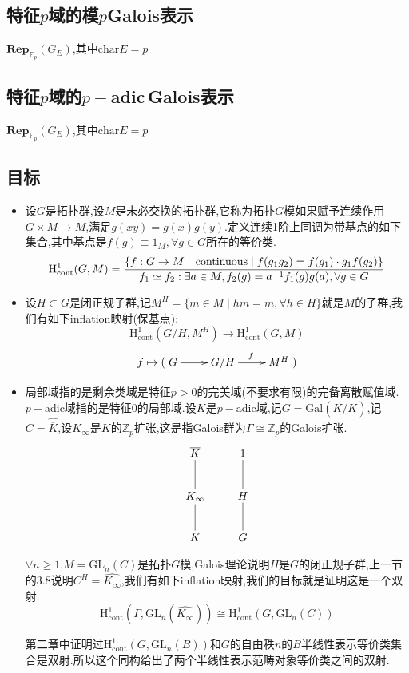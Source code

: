 \subsection{特征$p$域的模$p$\;Galois表示}

$\textbf{Rep}_{\mathbb{F}_p}(G_E)$,其中$\mathrm{char}E=p$

\subsection{特征$p$域的$p-$adic\,Galois表示}

$\textbf{Rep}_{\mathbb{F}_p}(G_E)$,其中$\mathrm{char}E=p$



\newpage
\subsection{目标}
\begin{itemize}
	\item 设$G$是拓扑群,设$M$是未必交换的拓扑群,它称为拓扑$G$模如果赋予连续作用$G\times M\to M$,满足$g(xy)=g(x)g(y)$.定义连续1阶上同调为带基点的如下集合,其中基点是$f(g)\equiv 1_M,\forall g\in G$所在的等价类.
	$$\mathrm{H}^1_{\mathrm{cont}}(G,M)=\frac{\{f:G\to M\text{\quad continuous}\mid f(g_1g_2)=f(g_1)\cdot g_1f(g_2)\}}{f_1\simeq f_2:\exists a\in M,f_2(g)=a^{-1}f_1(g)g(a),\forall g\in G}$$
	\item 设$H\subset G$是闭正规子群,记$M^H=\{m\in M\mid hm=m,\forall h\in H\}$就是$M$的子群,我们有如下inflation映射(保基点):
	$$\mathrm{H}^1_{\mathrm{cont}}(G/H,M^H)\to\mathrm{H}^1_{\mathrm{cont}}(G,M)$$
	$$f\mapsto(\xymatrix{G\ar[r]&G/H\ar[r]^f&M^H})$$
	\item 局部域指的是剩余类域是特征$p>0$的完美域(不要求有限)的完备离散赋值域.$p-$adic域指的是特征0的局部域.设$K$是$p-$adic域,记$G=\mathrm{Gal}(\overline{K}/K)$,记$C=\widehat{\overline{K}}$,设$K_{\infty}$是$K$的$\mathbb{Z}_p$扩张,这是指Galois群为$\Gamma\cong\mathbb{Z}_p$的Galois扩张.
	$$\xymatrix{\overline{K}\ar@{-}[d]&{1}\ar@{-}[d]\\K_{\infty}\ar@{-}[d]&H\ar@{-}[d]\\K&G}$$
	
	$\forall n\ge1$,$M=\mathrm{GL}_n(C)$是拓扑$G$模,Galois理论说明$H$是$G$的闭正规子群,上一节的3.8说明$C^H=\widehat{K_{\infty}}$,我们有如下inflation映射,我们的目标就是证明这是一个双射.
	$$\mathrm{H}^1_{\mathrm{cont}}(\Gamma,\mathrm{GL}_n(\widehat{K_{\infty}}))\cong\mathrm{H}^1_{\mathrm{cont}}(G,\mathrm{GL}_n(C))$$
	
	第二章中证明过$\mathrm{H}^1_{\mathrm{cont}}(G,\mathrm{GL}_n(B))$和$G$的自由秩$n$的$B$半线性表示等价类集合是双射.所以这个同构给出了两个半线性表示范畴对象等价类之间的双射.
\end{itemize}

